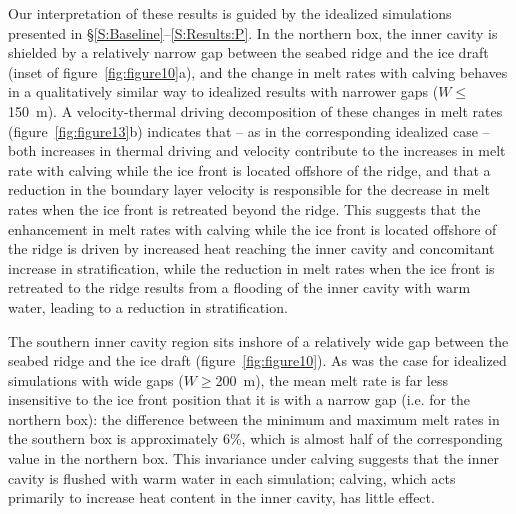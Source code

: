 \documentclass[draft]{agujournal2019}
\begin{document}
 
Our interpretation of these results is guided by the idealized simulations presented in \S\ref{S:Baseline}--\ref{S:Results:P}. In the northern box, the inner cavity is shielded by a relatively narrow gap between the seabed ridge and the ice draft (inset of figure~\ref{fig:figure10}a), and the change in melt rates with calving behaves in a qualitatively similar way to idealized results with narrower gaps ($W\leq$150~m). A velocity-thermal driving decomposition of these changes in melt rates (figure~\ref{fig:figure13}b) indicates that -- as in the corresponding idealized case -- both increases in thermal driving and velocity contribute to the increases in melt rate with calving while the ice front is located offshore of the ridge, and that a reduction in the boundary layer velocity is responsible for the decrease in melt rates when the ice front is retreated beyond the ridge. This suggests that the enhancement in melt rates with calving while the ice front is located offshore of the ridge is driven by increased heat reaching the inner cavity and concomitant increase in stratification, while the reduction in melt rates when the ice front is retreated to the ridge results from a flooding of the inner cavity with warm water, leading to a reduction in stratification. 


The southern inner cavity region sits inshore of a relatively wide gap between the seabed ridge and the ice draft (figure~\ref{fig:figure10}). As was the case for idealized simulations with wide gaps ($W\geq$200~m), the mean melt rate is far less insensitive to the ice front position that it is with a narrow gap (i.e. for the northern box): the difference between the minimum and maximum melt rates in the southern box is approximately 6\%, which is almost half of the corresponding value in the northern box. This invariance under calving suggests that the inner cavity is flushed with warm water in each simulation; calving, which acts primarily to increase heat content in the inner cavity, has little effect.
\end{document}
